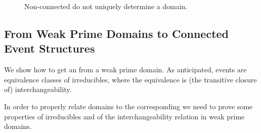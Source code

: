 \begin{figure}
  \hfill
  \hfill
  \hfill$\mbox{}$
  \caption{Non-connected {\esabbr} do not uniquely determine a domain.}
  \label{fi:non-fusion}
\end{figure}

 


\subsection{From {Weak Prime Domains} to {Connected} Event Structures}
\label{ss:domain-to-es}
We show how to get an {\esabbr} from a weak prime domain. As {anticipated},
events are equivalence classes of irreducibles, where the equivalence
is (the transitive closure of) interchangeability.

In order to properly relate domains to the corresponding {\esabbr} we need to prove some properties of irreducibles and of the interchangeability relation in weak prime domains.


